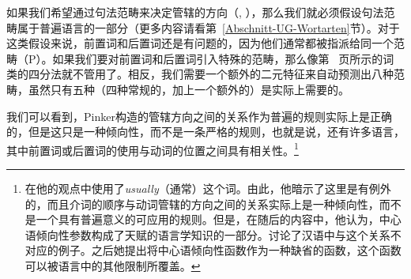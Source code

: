 如果我们希望通过句法范畴来决定管辖的方向（\citealp[]{GW94a}, \citealp[]{Chomsky2005a}），那么我们就必须假设句法范畴属于普遍语言的一部分（更多内容请看第~\ref{Abschnitt-UG-Wortarten}节）。对于这类假设来说，前置词和后置词还是有问题的，因为他们通常都被指派给同一个范畴（P）。如果我们要对前置词和后置词引入特殊的范畴，那么像第~\pageref{Tabelle-Merkmalszerlegung-Wortarten} 页所示的词类的四分法就不管用了。相反，我们需要一个额外的二元特征来自动预测出八种范畴，虽然只有五种（四种常规的，加上一个额外的）是实际上需要的。

我们可以看到，Pinker构造的管辖方向之间的关系作为普遍的规则实际上是正确的，但是这只是一种倾向性，而不是一条严格的规则，也就是说，还有许多语言，其中前置词或后置词的使用与动词的位置之间具有相关性\citep[]{Dryer92a}。\footnote{
\citet[]{Pinker94a}在他的观点中使用了\emph{usually}（通常）这个词。由此，他暗示了这里是有例外的，而且介词的顺序与动词管辖的方向之间的关系实际上是一种倾向性，而不是一个具有普遍意义的可应用的规则。但是，在随后的内容中，他认为，中心语倾向性参数构成了天赋的语言学知识的一部分。\citet[]{Travis84a-u}讨论了汉语中与这个关系不对应的例子。之后她提出将中心语倾向性函数作为一种缺省的函数，这个函数可以被语言中的其他限制所覆盖。
} 

